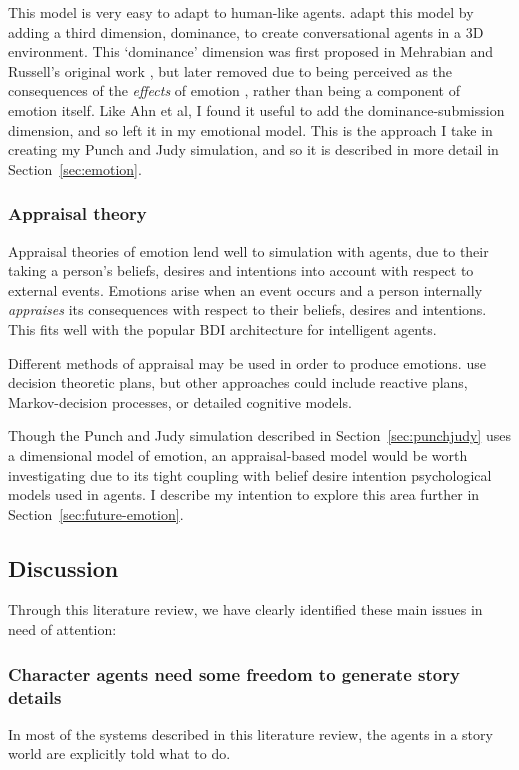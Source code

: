 \documentclass[11pt]{report}
\begin{document}
This model is very easy to adapt to human-like agents. \citet{ahn2012nvc} adapt this model by adding a third dimension, dominance, to create conversational agents in a 3D environment. This `dominance' dimension was first proposed in Mehrabian and Russell's original work \citep{mehrabian1974approach}, but later removed due to being perceived as the consequences of the \emph{effects\/} of emotion \citep{russell1980circumplex}, rather than being a component of emotion itself. Like Ahn et al, I found it useful to add the dominance-submission dimension, and so left it in my emotional model. This is the approach I take in creating my Punch and Judy simulation, and so it is described in more detail in Section~\ref{sec:emotion}.

\subsubsection{Appraisal theory}
Appraisal theories of emotion lend well to simulation with agents, due to their taking a person's beliefs, desires and intentions into account with respect to external events. Emotions arise when an event occurs and a person internally \emph{appraises} its consequences with respect to their beliefs, desires and intentions. This fits well with the popular BDI architecture for intelligent agents.

Different methods of appraisal may be used in order to produce emotions. \citet{gratch2004domain} use decision theoretic plans, but other approaches could include reactive plans, Markov-decision processes, or detailed cognitive models.

Though the Punch and Judy simulation described in Section~\ref{sec:punchjudy} uses a dimensional model of emotion, an appraisal-based model would be worth investigating due to its tight coupling with belief desire intention psychological models used in agents. I describe my intention to explore this area further in Section~\ref{sec:future-emotion}.

\subsection{Discussion}\label{sec:litrev-discussion}
Through this literature review, we have clearly identified these main issues in
need of attention:

\subsubsection{Character agents need some freedom to generate story details}
In most of the systems described in this literature review, the agents in a
story world are explicitly told what to do.
\end{document}
